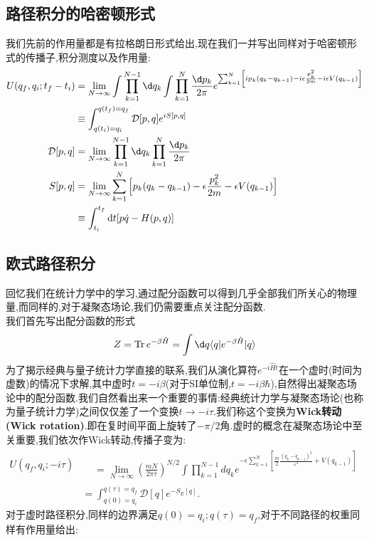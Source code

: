 \subsection*{路径积分的哈密顿形式}
我们先前的作用量都是有拉格朗日形式给出,现在我们一并写出同样对于哈密顿形式的传播子,积分测度以及作用量:
\begin{equation}
	\begin{aligned}
		U(q_f,q_i;t_f-t_i)&=\lim_{N\to\infty}\int\prod_{k=1}^{N-1}\d q_{k}\int\prod_{k=1}^{N}\frac{\d p_{k}}{2\pi}e^{\sum_{k=1}^{N}\left[ip_{k}(q_{k}-q_{k-1})-i\epsilon\frac{p_{k}^{2}}{2m}-i\epsilon V(q_{k-1})\right]}\\
		&\equiv\int_{q(t_i)=q_i}^{q(t_f)=q_f}\mathcal{D}[p,q] e^{iS[p,q]} \\
		\mathcal{D}[p,q]&=\lim_{N\to\infty}\prod_{k=1}^{N-1}\d q_k\prod_{k=1}^N\frac{\d p_k}{2\pi}\\
		S[p,q]&=\lim_{N\to\infty}\sum_{k=1}^N\Big[p_k(q_k-q_{k-1})-\epsilon\frac{p_k^2}{2m}-\epsilon V(q_{k-1})\Big] \\
		&\equiv\int_{t_i}^{t_f}\dt [p\dot{q}-H(p,q)]
	\end{aligned}
\end{equation}








\subsection{欧式路径积分}
回忆我们在统计力学中的学习,通过配分函数可以得到几乎全部我们所关心的物理量,而同样的,对于凝聚态场论,我们仍需要重点关注配分函数.\\
我们首先写出配分函数的形式
\begin{equation}
	Z=\operatorname{Tr}e^{{-\beta\hat{H}}}=\int \d q\langle q|e^{{-\beta\hat{H}}}|q\rangle
\end{equation}
为了揭示经典与量子统计力学直接的联系,我们从演化算符$e^{-i\hat{H}t}$在一个虚时(时间为虚数)的情况下求解,其中虚时$t=-i\beta$(对于SI单位制,$t=-i\beta\hbar$),自然得出凝聚态场论中的配分函数.我们自然看出来一个重要的事情:经典统计力学与凝聚态场论(也称为量子统计力学)之间仅仅差了一个变换$t\to-i\tau$.我们称这个变换为\textbf{Wick转动(Wick rotation)}.即在复时间平面上旋转了$-\pi/2$角.虚时的概念在凝聚态场论中至关重要,我们依次作Wick转动,传播子变为:
\begin{equation}
	\begin{aligned}
		U(q_f,q_i;-i\tau)& \begin{aligned}&=\lim_{N\to\infty}\left(\frac{mN}{2\pi\tau}\right)^{N/2}\int\prod_{k=1}^{N-1}dq_k e^{-\epsilon\sum_{k=1}^N\left[\frac{m}{2}\frac{\left(q_k-q_{k-1}\right)^2}{\epsilon^2}+V\left(q_{k-1}\right)\right]}\end{aligned} \\
		&=\int_{q(0)=q_i}^{q(\tau)=q_f}\mathcal{D}[q] e^{-S_E[q]}.
	\end{aligned}
\end{equation}
对于虚时路径积分,同样的边界满足$q(0)=q_i;q(\tau)=q_f$,对于不同路径的权重同样有作用量给出:\\


